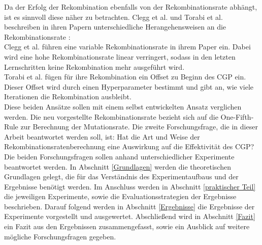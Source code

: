 Da der Erfolg der Rekombination ebenfalls von der Rekombinationsrate abhängt, ist es sinnvoll diese näher zu betrachten. 
Clegg et al. und Torabi et al. beschreiben in ihren Papern unterschiedliche Herangehensweisen an die Rekombinationsrate \cite{clegg_new_2007, torabi_using_2022}:\\
Clegg et al. führen eine variable Rekombinationsrate in ihrem Paper ein.
Dabei wird eine hohe Rekombinationsrate linear verringert, sodass in den letzten Lernschritten keine Rekombination mehr ausgeführt wird. \cite{clegg_new_2007}\\
Torabi et al. fügen für ihre Rekombination ein Offset zu Beginn des CGP ein. 
Dieser Offset wird durch einen Hyperparameter bestimmt und gibt an, wie viele Iterationen die Rekombination ausbleibt. \cite{torabi_using_2022}\\
Diese beiden Ansätze sollen mit einem selbst entwickelten Ansatz verglichen werden.
Die neu vorgestellte Rekombinationsrate bezieht sich auf die One-Fifth-Rule zur Berechnung der Mutationsrate.
Die zweite Forschungsfrage, die in dieser Arbeit beantwortet werden soll, ist: \glqq Hat die Art und Weise der Rekombinationsratenberechnung eine Auswirkung auf die Effektivität des CGP?\grqq\\

Die beiden Forschungsfragen sollen anhand unterschiedlicher Experimente beantwortet werden.
In Abschnitt \ref{Grundlagen} werden die theoretischen Grundlagen gelegt, die für das Verständnis des Experimentaufbaus und der Ergebnisse benötigt werden.
Im Anschluss werden in Abschnitt \ref{praktischer Teil} die jeweiligen Experimente, sowie die Evaluationsstrategien der Ergebnisse beschrieben.
Darauf folgend werden in Abschnitt \ref{Ergebnisse} die Ergebnisse der Experimente vorgestellt und ausgewertet.
Abschließend wird in Abschnitt \ref{Fazit} ein Fazit aus den Ergebnissen zusammengefasst, sowie ein Ausblick auf weitere mögliche Forschungsfragen gegeben.
